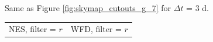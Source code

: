 \documentclass[preprintm,linenumbers]{aastex631}
\begin{document}
\begin{figure}
\begin{tabular}{@{}c@{}c@{}}
			\end{tabular}
			\caption{
   Same as Figure \ref{fig:skymap_cutouts_g_7} for $\Delta t$ = 3 d. 
    }
	\label{fig:skymap_cutouts_g_3}
		\end{figure}

  
  	\begin{figure}
			\centering
            			\begin{tabular}{@{}c@{}c@{}}
                 NES, filter = $r$ & WFD, filter = $r$ \\

\end{tabular}
\end{figure}
\end{document}
